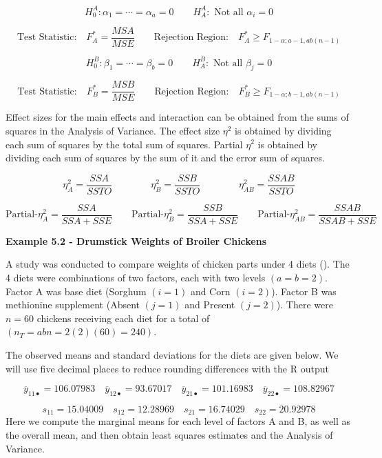 \documentclass[
]{book}
\begin{document}
\[
H_0^A: \alpha_1 = \cdots = \alpha_a=0 \qquad
H_A^A: \mbox { Not all } \alpha_i=0
\]

\[
\mbox{Test Statistic:} \quad F_{A}^*=\frac{MSA}{MSE}
\qquad
\mbox{Rejection Region:} \quad F_{A}^* \ge F_{1-\alpha;a-1,ab(n-1)}
\]

\[
H_0^B: \beta_1 = \cdots = \beta_b=0 \qquad
H_A^B: \mbox { Not all } \beta_j=0
\]

\[
\mbox{Test Statistic:} \quad F_{B}^*=\frac{MSB}{MSE}
\qquad
\mbox{Rejection Region:} \quad F_{B}^* \ge F_{1-\alpha;b-1,ab(n-1)}
\]

Effect sizes for the main effects and interaction can be obtained from
the sums of squares in the Analysis of Variance. The effect size
\(\eta^2\) is obtained by dividing each sum of squares by the total sum
of squares. Partial \(\eta^2\) is obtained by dividing each sum of
squares by the sum of it and the error sum of squares.

\[
\eta_A^2 = \frac{SSA}{SSTO}  \qquad \qquad \eta_B^2 = \frac{SSB}{SSTO} \qquad \qquad \eta_{AB}^2=\frac{SSAB}{SSTO}
\]

\[
\mbox{Partial-} \eta_A^2 = \frac{SSA}{SSA+SSE}   \qquad
\mbox{Partial-} \eta_B^2 = \frac{SSB}{SSA+SSE}   \qquad
\mbox{Partial-} \eta_{AB}^2 = \frac{SSAB}{SSAB+SSE}   \qquad
\]

\textbf{Example 5.2 - Drumstick Weights of Broiler Chickens}

A study was conducted to compare weights of chicken parts under 4 diets
(). The 4 diets
were combinations of two factors, each with two levels \((a=b=2)\).
Factor A was base diet (Sorghum \((i=1)\) and Corn \((i=2)\)). Factor B
was methionine supplement (Absent \((j=1)\) and Present \((j=2)\)).
There were \(n=60\) chickens receiving each diet for a total of
\((n_T=abn=2(2)(60)=240)\).

The observed means and standard deviations for the diets are given
below. We will use five decimal places to reduce rounding differences
with the R output

\[
\overline{y}_{11\bullet}=106.07983 \quad 
\overline{y}_{12\bullet}=93.67017 \quad 
\overline{y}_{21\bullet}=101.16983 \quad 
\overline{y}_{22\bullet}=108.82967
\]

\[
s_{11}=15.04009 \quad s_{12}=12.28969 \quad s_{21}=16.74029 \quad s_{22}=20.92978
\] Here we compute the marginal means for each level of factors A and B,
as well as the overall mean, and then obtain least squares estimates and
the Analysis of Variance.
\end{document}
